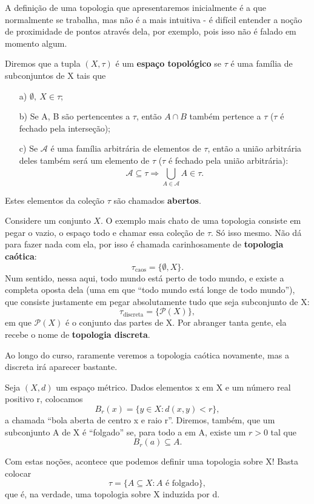 \documentclass[../topology_notes.tex]{subfiles}
\begin{document}
A definição de uma topologia que apresentaremos inicialmente é a que normalmente se trabalha, mas não é a mais intuitiva - é difícil entender a noção de proximidade de pontos através dela, por exemplo, pois isso não é falado em momento algum.
\begin{def*}
	Diremos que a tupla \((X, \tau )\) é um \textbf{espaço topológico} se \(\tau \) é uma família de subconjuntos de X tais que
	\begin{itemize}
		\item[a)] \(\emptyset ,\: X\in\tau \);
		\item[b)] Se A, B são pertencentes a \(\tau \), então \(A\cap B\) também pertence a \(\tau \) (\(\tau \) é fechado pela interseção);
		\item[c)] Se \(\mathcal{A}\) é uma família arbitrária de elementos de \(\tau \), então a união arbitrária deles também será um elemento de \(\tau \) (\(\tau \) é fechado pela união arbitrária):
		      \[
			      \mathcal{A}\subseteq \tau \Rightarrow \bigcup_{A\in \mathcal{A}}^{}A\in \tau .
		      \]
	\end{itemize}
	Estes elementos da coleção \(\tau \) são chamados \textbf{abertos}.
\end{def*}
\begin{example}
	Considere um conjunto \(X\). O exemplo mais chato de uma topologia consiste em pegar o vazio, o espaço todo e chamar essa coleção de \(\tau \). Só isso mesmo. Não dá para fazer nada com ela, por isso é chamada carinhosamente de \textbf{topologia caótica}:
	\[
		\tau_{\mathrm{caos}} = \{\emptyset , X\}.
	\]
	Num sentido, nessa aqui, todo mundo está perto de todo mundo, e existe a completa oposta dela (uma em que ``todo mundo está longe de todo mundo''), que consiste justamente em pegar absolutamente tudo que seja subconjunto de X:
	\[
		\tau_{\mathrm{discreta}} = \{\mathcal{P}(X)\},
	\]
	em que \(\mathcal{P}(X)\) é o conjunto das partes de X. Por abranger tanta gente, ela recebe o nome de \textbf{topologia discreta}.

	Ao longo do curso, raramente veremos a topologia caótica novamente, mas a discreta irá aparecer bastante.
\end{example}
\begin{example}
	Seja \((X, d)\) um espaço métrico. Dados elementos x em X e um número real positivo r, colocamos
	\[
		B_{r}(x) = \{y\in X: d(x, y)<r\},
	\]
	a chamada ``bola aberta de centro x e raio r''. Diremos, também, que um subconjunto A de X é ``folgado'' se, para todo a em A, existe um \(r>0\) tal que
	\[
		B_{r}(a)\subseteq A.
	\]

	Com estas noções, acontece que podemos definir uma topologia sobre X! Basta colocar
	\[
		\tau = \{A\subseteq X: A\text{ é folgado}\},
	\]
	que é, na verdade, uma topologia sobre X induzida por d.
\end{example}
\end{document}
